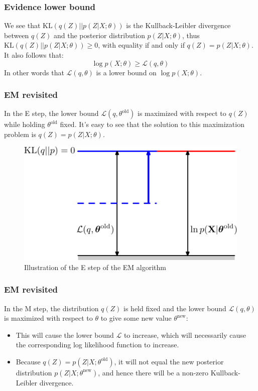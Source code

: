 \documentclass{beamer}
\begin{document}
\begin{frame}
    \frametitle{Evidence lower bound}
    We see that $\mathrm{KL}(q(Z)||p(Z|X;\theta))$ is the Kullback-Leibler divergence between $q(Z)$ and the posterior distribution $p(Z|X;\theta)$, thus $\mathrm{KL}(q(Z)||p(Z|X;\theta))\ge{}0$, with equality if and only if $q(Z)=p(Z|X;\theta)$. It also follows that:
    \begin{equation*}
        \log{}p(X;\theta)\ge\mathcal{L}(q,\theta)
    \end{equation*}
    In other words that $\mathcal{L}(q,\theta)$ is a lower bound on $\log{}p(X;\theta)$.
\end{frame}

\begin{frame}
    \frametitle{EM revisited}
    In the E step, the lower bound $\mathcal{L}(q,\theta^{\textrm{old}})$ is maximized with respect to $q(Z)$ while holding $\theta^{\textrm{old}}$ fixed. It's easy to see that the solution to this maximization problem is $q(Z)=p(Z|X;\theta)$.
    \begin{figure}
        \caption{Illustration of the E step of the EM algorithm}
        \includegraphics{Figure_14.pdf}
    \end{figure}
\end{frame}

\begin{frame}
    \frametitle{EM revisited}
    In the M step, the distribution $q(Z)$ is held fixed and the lower bound $\mathcal{L}(q,\theta)$ is maximized with respect to $\theta$ to give some new value $\theta^{\textrm{new}}$:
    \begin{itemize}
        \item This will cause the lower bound $\mathcal{L}$ to increase, which will necessarily cause the corresponding log likelihood function to increase.
        \item Because $q(Z)=p(Z|X;\theta^{\textrm{old}})$, it will not equal the new posterior distribution $p(Z|X;\theta^{\textrm{new}})$, and hence there will be a non-zero Kullback-Leibler divergence.
    \end{itemize}
\end{frame}
\end{document}
